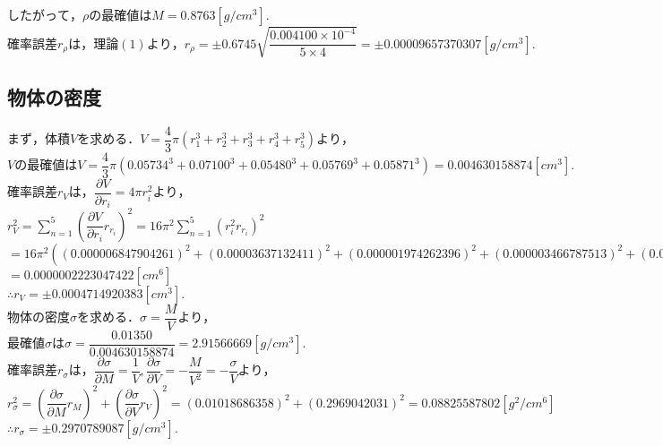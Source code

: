 \documentclass[a4paper,1pt]{jsarticle}
\begin{document}
$したがって，\rho の最確値はM=0.8763[g/cm^3].$\\

$確率誤差r_\rho は，理論(1)より，r_\rho =\pm0.6745\sqrt{\dfrac{0.004100\times10^{-4}}{5\times4}}=\pm0.00009657370307[g/cm^3].$\\





\clearpage

\subsection*{物体の密度}
$まず，体積Vを求める．V=\dfrac{4}{3}\pi (r_1^3+r_2^3+r_3^3+r_4^3+r_5^3)より，$\\

$Vの最確値はV=\dfrac{4}{3}\pi (0.05734^3+0.07100^3+0.05480^3+0.05769^3+0.05871^3)=0.004630158874[cm^3].$\\

$確率誤差r_Vは，\dfrac{\partial V}{\partial r_i}=4\pi r_i^2より，$\\

$r_V^2=\sum_{n = 1}^{5}(\dfrac{\partial V}{\partial r_i}r_{r_i})^2=16\pi ^2\sum_{n = 1}^{5}(r_i^2r_{r_i})^2$\\

$=16\pi ^2((0.000006847904261)^2+(0.00003637132411)^2+(0.000001974262396)^2+(0.000003466787513)^2+(0.000004698964297)^2)$\\

$=0.0000002223047422[cm^6]$\\

$\therefore r_V=\pm0.0004714920383[cm^3].$\\

$物体の密度\sigma を求める．\sigma =\dfrac{M}{V}より，$\\

$最確値\sigma は\sigma =\dfrac{0.01350}{0.004630158874}=2.91566669[g/cm^3].$\\

$確率誤差r_\sigma は，\dfrac{\partial \sigma }{\partial M}=\dfrac{1}{V},\dfrac{\partial \sigma }{\partial V}=-\dfrac{M}{V^2}=-\dfrac{\sigma }{V}より，$\\

$r_\sigma ^2=(\dfrac{\partial \sigma }{\partial M}r_M)^2+(\dfrac{\partial \sigma }{\partial V}r_V)^2=(0.01018686358)^2+(0.2969042031)^2=0.08825587802[g^2/cm^6]$\\

$\therefore r_\sigma =\pm0.2970789087[g/cm^3].$
\end{document}
